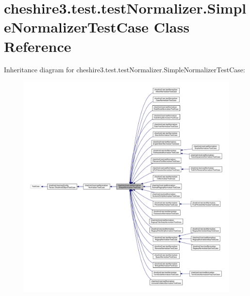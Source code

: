 \hypertarget{classcheshire3_1_1test_1_1test_normalizer_1_1_simple_normalizer_test_case}{\section{cheshire3.\-test.\-test\-Normalizer.\-Simple\-Normalizer\-Test\-Case Class Reference}
\label{classcheshire3_1_1test_1_1test_normalizer_1_1_simple_normalizer_test_case}
}


Inheritance diagram for cheshire3.\-test.\-test\-Normalizer.\-Simple\-Normalizer\-Test\-Case\-:
\nopagebreak
\begin{figure}[H]
\begin{center}
\leavevmode
\includegraphics[width=350pt]{classcheshire3_1_1test_1_1test_normalizer_1_1_simple_normalizer_test_case__inherit__graph}
\end{center}
\end{figure}


